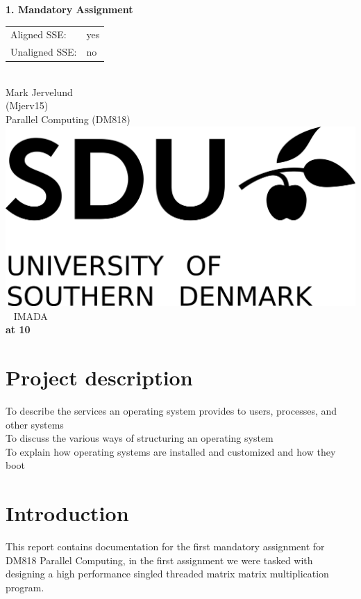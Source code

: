 \documentclass[a4paper,10pt,titlepage]{report}
\date{}
\begin{document}
\begin{titlepage}
\centering
    \vspace*{9\baselineskip}
    \huge
    \bfseries
    1. Mandatory Assignment \\
    \begin{tabular}{ll}
    Aligned SSE: & yes \\
    Unaligned SSE: & no \\
\end{tabular} \\
    \normalfont 
    Mark Jervelund  \\
    (Mjerv15) \\
	\huge    
    Parallel Computing (DM818)  \\[4\baselineskip]
    \normalfont
	\includegraphics[scale=1]{SDU_logo}
    \vfill\ 
    \vspace{5mm}
    IMADA \\

    \textbf{\datedate}  \bf{at 10} \\[2\baselineskip]
\end{titlepage}

\renewcommand{\thepage}{\roman{page}}%
\tableofcontents
\newpage
\setcounter{page}{1}
\renewcommand{\thepage}{\arabic{page}}
\section{Project description}
To describe the services an operating system provides to
users, processes, and other systems\\
To discuss the various ways of structuring an operating
system\\
To explain how operating systems are installed and
customized and how they boot\\
\newpage

\section{Introduction}
This report contains documentation for the first mandatory assignment for DM818 Parallel Computing, in the first assignment we were tasked with designing a high performance singled threaded matrix matrix multiplication program.
\end{document}
